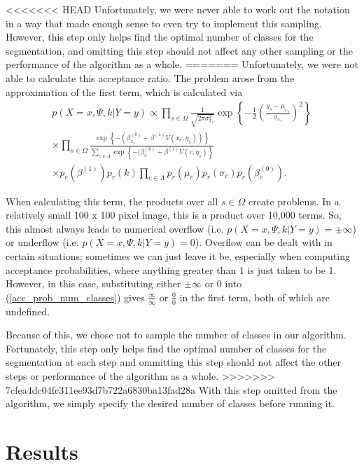 \documentclass[11pt]{article}
\begin{document}
<<<<<<< HEAD
Unfortunately, we were never able to work out the notation in a way that made enough sense to even try to implement this sampling.
However, this step only helps find the optimal number of classes for the segmentation, and omitting this step should not affect any other sampling or the performance of the algorithm as a whole.
=======
Unfortunately, we were not able to calculate this acceptance ratio.
The problem arose from the approximation of the first term, which is calculated via
\begin{equation}
\begin{aligned}
   p(X=x, \Psi, k | Y = y) \propto \prod_{s \in \Omega}  \frac{1}{\sqrt{2 \pi \sigma_{x_s}^2}} \exp \left \{ -\frac{1}{2} \left( \frac{y_s - \mu_{x_s} }{ \sigma_{x_s}}\right)^2  \right \} \\
   \times \prod_{s \in \Omega} \frac{\exp \left \{ - \left(\beta_{x_s}^{(0)} + \beta^{(1)} V(x_s, \eta_s) \right)  \right \} }{\sum_{c \in \Lambda} \exp \left \{ -(\beta^{(0)}_c + \beta^{(1)} V(c, \eta_s)  \right \}} \\
   \times p_r\left(\beta^{(1)}\right) p_r(k) \prod_{c \in \Lambda} p_r (\mu_c) p_r ( \sigma_c ) p_r (\beta_c^{(0)}).
\end{aligned}
\end{equation}

When calculating this term, the products over all $ s \in \Omega $ create problems.
In a relatively small 100 x 100 pixel image, this is a product over 10,000 terms.
So, this almost always leads to numerical overflow (i.e. $p(X=x, \Psi, k | Y = y) = \pm \infty $) or underflow (i.e. $ p(X=x, \Psi, k | Y = y) = 0$).
Overflow can be dealt with in certain situations; sometimes we can just leave it be, especially when computing acceptance probabilities, where anything greater than 1 is just taken to be 1.
However, in this case, substituting either $\pm\infty$ or $ 0 $ into (\ref{acc_prob_num_classes}) gives $ \frac{\infty}{\infty} $ or $ \frac{0}{0} $ in the first term, both of which are undefined.

Because of this, we chose not to sample the number of classes in our algorithm.
Fortunately, this step only helps find the optimal number of classes for the segmentation at each step and ommitting this step should not affect the other steps or performance of the algorithm as a whole.
>>>>>>> 7cfea4dc04fc311ee93d7b722a6830ba13fad28a
With this step omitted from the algorithm, we simply specify the desired number of classes before running it.

\section{Results}
\end{document}
